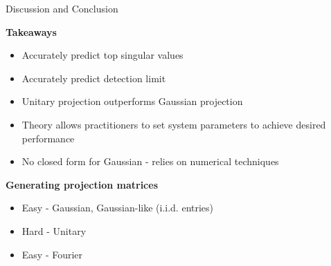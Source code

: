 \documentclass[8pt]{beamer}
\begin{document}
\begin{frame}{Discussion and Conclusion}

  \textbf{Takeaways}
  \begin{itemize}
  \item Accurately predict top singular values
  \item Accurately predict detection limit
  \item Unitary projection outperforms Gaussian projection
  \item Theory allows practitioners to set system parameters to achieve desired
    performance 
  \item No closed form for Gaussian - relies on numerical techniques
  \end{itemize}
  
  \vspace{2ex}

  \textbf{Generating projection matrices}
  \begin{itemize}
  \item Easy - Gaussian, Gaussian-like (i.i.d. entries)    
  \item Hard - Unitary 
  \item Easy - Fourier
  \end{itemize}

\end{frame}
\end{document}
